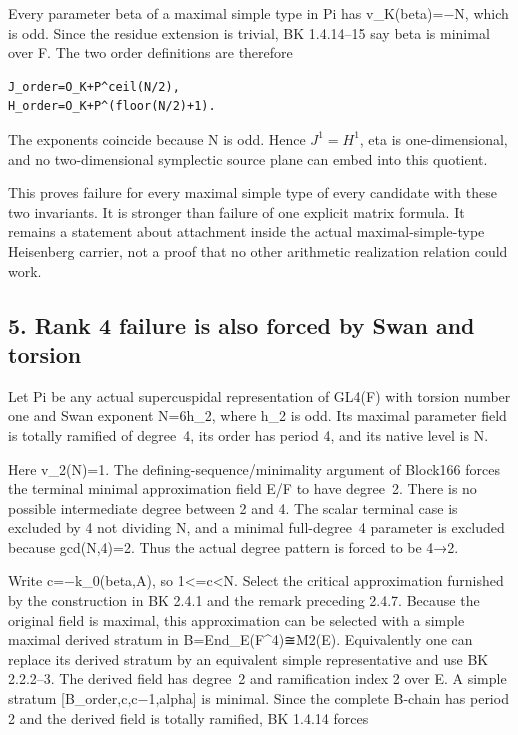 Every parameter beta of a maximal simple type in Pi has v\_K(beta)=−N,
which is odd. Since the residue extension is trivial, BK 1.4.14--15 say
beta is minimal over F. The two order definitions are therefore

\begin{Verbatim}[fontsize=\small,breaklines=true,breakanywhere=true]
J_order=O_K+P^ceil(N/2),
H_order=O_K+P^(floor(N/2)+1).
\end{Verbatim}

The exponents coincide because N is odd. Hence \(J^1=H^1\),
eta is one-dimensional, and no two-dimensional symplectic source plane
can embed into this quotient.

This proves failure for every maximal simple type of every candidate
with these two invariants. It is stronger than failure of one explicit
matrix formula. It remains a statement about attachment inside the
actual maximal-simple-type Heisenberg carrier, not a proof that no other
arithmetic realization relation could work.

\hypertarget{dyadic_capacity-rank4-failure-is-also-forced-by-swan-and-torsion}{%
\subsection{5. Rank 4 failure is also forced by Swan and
torsion}\label{dyadic_capacity-rank4-failure-is-also-forced-by-swan-and-torsion}}

Let Pi be any actual supercuspidal representation of GL4(F) with torsion
number one and Swan exponent N=6h\_2, where h\_2 is odd. Its maximal
parameter field is totally ramified of degree~4, its order has period 4,
and its native level is N.

Here v\_2(N)=1. The defining-sequence/minimality argument of Block166
forces the terminal minimal approximation field E/F to have degree~2.
There is no possible intermediate degree between 2 and 4. The scalar
terminal case is excluded by 4 not dividing N, and a minimal
full-degree~4 parameter is excluded because gcd(N,4)=2. Thus the actual
degree pattern is forced to be 4→2.

Write c=−k\_0(beta,A), so 1\textless=c\textless N. Select the critical
approximation furnished by the construction in BK 2.4.1 and the remark
preceding 2.4.7. Because the original field is maximal, this
approximation can be selected with a simple maximal derived stratum in
B=End\_E(F\^{}4)≅M2(E). Equivalently one can replace its derived stratum
by an equivalent simple representative and use BK 2.2.2--3. The derived
field has degree~2 and ramification index 2 over E. A simple stratum
{[}B\_order,c,c−1,alpha{]} is minimal. Since the complete B-chain has
period 2 and the derived field is totally ramified, BK 1.4.14 forces

